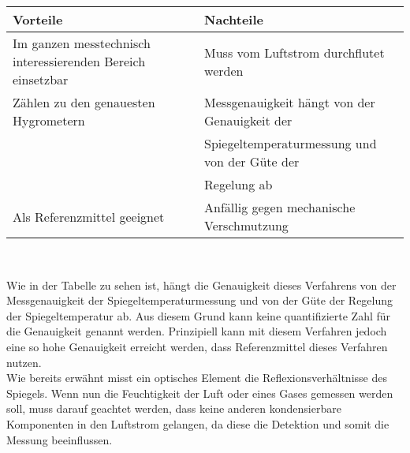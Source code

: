 
\begin{tabular}{l|l}
\textbf{Vorteile} & \textbf{Nachteile} \\ 
\hline 
Im ganzen messtechnisch interessierenden Bereich einsetzbar & Muss vom Luftstrom durchflutet werden \\ 
\hline 
Zählen zu den genauesten Hygrometern & Messgenauigkeit hängt von der Genauigkeit der \\&Spiegeltemperaturmessung und von der Güte der \\& Regelung ab  \\ 
\hline 
Als Referenzmittel geeignet & Anfällig gegen mechanische Verschmutzung \\ 
\end{tabular}\\
\begin{multicols}{3} 
Wie in der Tabelle zu sehen ist, hängt die Genauigkeit dieses Verfahrens von der Messgenauigkeit der Spiegeltemperaturmessung und von der Güte der Regelung der Spiegeltemperatur ab. Aus diesem Grund kann keine quantifizierte Zahl für die Genauigkeit genannt werden. Prinzipiell kann mit diesem Verfahren jedoch eine so hohe Genauigkeit erreicht werden, dass Referenzmittel dieses Verfahren nutzen.\\
Wie bereits erwähnt misst ein optisches Element die Reflexionsverhältnisse des Spiegels. Wenn nun die Feuchtigkeit der Luft oder eines Gases gemessen werden soll, muss darauf geachtet werden, dass keine anderen kondensierbare Komponenten in den Luftstrom gelangen, da diese die Detektion und somit die Messung beeinflussen.
\end{multicols}
